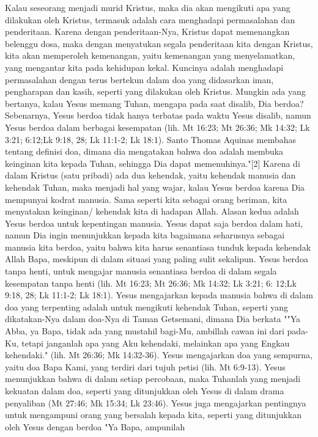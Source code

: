 Kalau seseorang menjadi murid Kristus, maka dia akan mengikuti apa yang
dilakukan oleh Kristus, termasuk adalah cara menghadapi permasalahan dan
penderitaan. Karena dengan penderitaan-Nya, Kristus dapat memenangkan belenggu
dosa, maka dengan menyatukan segala penderitaan kita dengan Kristus, kita akan
memperoleh kemenangan, yaitu kemenangan yang menyelamatkan, yang mengantar kita
pada  kehidupan kekal. Kuncinya adalah menghadapi permasalahan dengan terus
bertekun dalam doa yang didasarkan iman, pengharapan dan kasih, seperti yang
dilakukan oleh Kristus.
Mungkin ada yang bertanya, kalau Yesus memang Tuhan, mengapa pada saat disalib,
Dia berdoa? Sebenarnya, Yesus berdoa tidak hanya terbatas pada waktu Yesus
disalib, namun Yesus berdoa dalam berbagai kesempatan (lih. Mt 16:23; Mt 26:36;
Mk 14:32; Lk 3:21; 6:12;Lk 9:18, 28; Lk 11:1-2; Lk 18:1). Santo Thomas Aquinas
membahas tentang definisi doa, dimana dia mengatakan bahwa doa adalah membuka
keinginan kita kepada Tuhan, sehingga Dia dapat memenuhinya."[2] Karena di
dalam Kristus (satu pribadi) ada dua kehendak, yaitu kehendak manusia dan
kehendak Tuhan, maka menjadi hal yang wajar, kalau Yesus berdoa karena Dia
mempunyai kodrat manusia. Sama seperti kita sebagai orang beriman, kita
menyatakan keinginan/ kehendak kita di hadapan Allah.
Alasan kedua adalah Yesus berdoa untuk kepentingan manusia. Yesus dapat saja
berdoa dalam hati, namun Dia ingin menunjukkan kepada kita bagaimana seharusnya
sebagai manusia kita berdoa, yaitu bahwa kita harus senantiasa tunduk kepada
kehendak Allah Bapa, meskipun di dalam situasi yang paling sulit sekalipun.
Yesus berdoa tanpa henti, untuk mengajar manusia senantiasa berdoa di dalam
segala kesempatan tanpa henti (lih. Mt 16:23; Mt 26:36; Mk 14:32; Lk 3:21; 6:
12;Lk 9:18, 28; Lk 11:1-2; Lk 18:1).
Yesus mengajarkan kepada manusia bahwa di dalam doa yang terpenting adalah
untuk mengikuti kehendak Tuhan, seperti yang dikatakan-Nya dalam doa-Nya di
Taman Getsemani, dimana Dia berkata ""Ya Abba, ya Bapa, tidak ada yang mustahil
bagi-Mu, ambillah cawan ini dari pada-Ku, tetapi janganlah apa yang Aku
kehendaki, melainkan apa yang Engkau kehendaki." (lih. Mt 26:36; Mk 14:32-36).
Yesus mengajarkan doa yang sempurna, yaitu doa Bapa Kami, yang terdiri dari
tujuh petisi (lih. Mt 6:9-13).
Yesus menunjukkan bahwa di dalam setiap percobaan, maka Tuhanlah yang menjadi
kekuatan dalam doa, seperti yang ditunjukkan oleh Yesus di dalam drama
penyaliban (Mt 27:46; Mk 15:34; Lk 23:46).
Yesus juga mengajarkan pentingnya untuk mengampuni orang yang bersalah kepada
kita, seperti yang ditunjukkan oleh Yesus dengan berdoa "Ya Bapa, ampunilah
